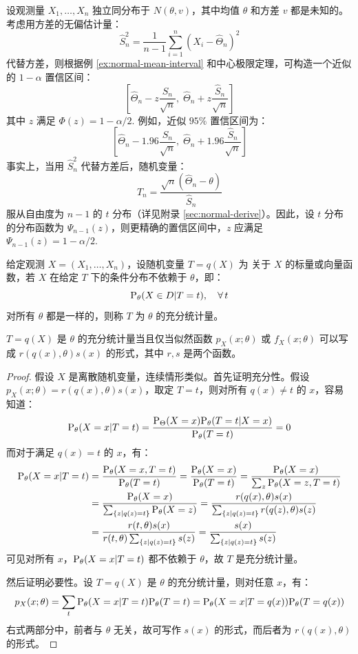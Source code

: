 \begin{example}[基于方差近似估计量的区间估计]
设观测量 $X_1,\ldots,X_n$ 独立同分布于 $N(\theta,v)$，其中均值 $\theta$ 和方差 $v$ 都是未知的。考虑用方差的无偏估计量：
\[
\hat S_n^2=\frac{1}{n-1}\sum_{i=1}^n(X_i-\hat\Theta_n)^2
\]
代替方差，则根据例 \ref{ex:normal-mean-interval} 和中心极限定理，可构造一个近似的 $1-\alpha$ 置信区间：
\[
\left[\hat\Theta_n-z\frac{\hat S_n}{\sqrt{n}},\;\hat\Theta_n+z\frac{\hat S_n}{\sqrt{n}}\right]
\]
其中 $z$ 满足 $\Phi(z)=1-\alpha/2$. 例如，近似 $95\%$ 置信区间为：
\[
\left[\hat\Theta_n-1.96\frac{\hat S_n}{\sqrt{n}},\;\hat\Theta_n+1.96\frac{\hat S_n}{\sqrt{n}}\right]
\]
事实上，当用 $\hat S_n^2$ 代替方差后，随机变量：
\[
T_n=\frac{\sqrt{n}(\hat\Theta_n-\theta)}{\hat S_n}
\]
服从自由度为 $n-1$ 的 $t$ 分布（详见附录 \ref{sec:normal-derive}）。因此，设 $t$ 分布的分布函数为 $\Psi_{n-1}(z)$，则更精确的置信区间中，$z$ 应满足 $\Psi_{n-1}(z)=1-\alpha/2$. 
\end{example}

\begin{definition}[充分统计量]
给定观测 $X=(X_1,\ldots,X_n)$，设随机变量 $T=q(X)$ 为 关于 $X$ 的标量或向量函数，若 $X$ 在给定 $T$ 下的条件分布不依赖于 $\theta$，即：
\[
\mathrm{P}_\theta(X\in D\vert T=t),\quad\forall\,t
\]
对所有 $\theta$ 都是一样的，则称 $T$ 为 $\theta$ 的充分统计量。
\end{definition}

\begin{theorem}[因子分解定理]
\label{thm:factorization}
$T=q(X)$ 是 $\theta$ 的充分统计量当且仅当似然函数 $p_X(x;\theta)$ 或 $f_X(x;\theta)$ 可以写成 $r(q(x),\theta)s(x)$ 的形式，其中 $r,s$ 是两个函数。
\end{theorem}
\begin{proof}
假设 $X$ 是离散随机变量，连续情形类似。首先证明充分性。假设 $p_X(x;\theta)=r(q(x),\theta)s(x)$，取定 $T=t$，则对所有 $q(x)\neq t$ 的 $x$，容易知道：
\[
\mathrm{P}_\theta(X=x\vert T=t)=\frac{\mathrm{P}_\Theta(X=x)\mathrm{P}_\theta(T=t\vert X=x)}{\mathrm{P}_\theta(T=t)}=0
\]
而对于满足 $q(x)=t$ 的 $x$，有：
\begin{align*}
\mathrm{P}_\theta(X=x\vert T=t)&=\frac{\mathrm{P}_\theta(X=x,T=t)}{\mathrm{P}_\theta(T=t)}=\frac{\mathrm{P}_\theta(X=x)}{\mathrm{P}_\theta(T=t)}=\frac{\mathrm{P}_\theta(X=x)}{\sum_z\mathrm{P}_\theta(X=z,T=t)}\\
&=\frac{\mathrm{P}_\theta(X=x)}{\sum_{\{z\mid q(z)=t\}}\mathrm{P}_\theta(X=z)}=\frac{r(q(x),\theta)s(x)}{\sum_{\{z\mid q(z)=t\}}r(q(z),\theta)s(z)}\\
&=\frac{r(t,\theta)s(x)}{r(t,\theta)\sum_{\{z\mid q(z)=t\}}s(z)}=\frac{s(x)}{\sum_{\{z\mid q(z)=t\}}s(z)}
\end{align*}
可见对所有 $x$，$\mathrm{P}_\theta(X=x\vert T=t)$ 都不依赖于 $\theta$，故 $T$ 是充分统计量。

然后证明必要性。设 $T=q(X)$ 是 $\theta$ 的充分统计量，则对任意 $x$，有：
\[
p_X(x;\theta)=\sum_t\mathrm{P}_\theta(X=x\vert T=t)\mathrm{P}_\theta(T=t)=\mathrm{P}_\theta(X=x\vert T=q(x))\mathrm{P}_\theta(T=q(x))
\]
右式两部分中，前者与 $\theta$ 无关，故可写作 $s(x)$ 的形式，而后者为 $r(q(x),\theta)$ 的形式。
\end{proof}

